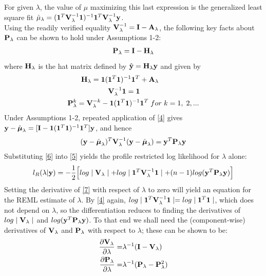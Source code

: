 \documentclass[11pt]{article}
\begin{document}
For given $\lambda$, the value of $\mu$ maximizing this last expression is the generalized least square fit $\hat{\mu}_\lambda=(\mathbf{1}^T{\bf V}_\lambda^{-1}\mathbf{1})^{-1}\mathbf{1}^T{\bf V}_\lambda^{-1}{\bf y}$.\\
Using the readily verified equality ${\bf V}_\lambda^{-1}={\bf I}-{\bf A}_\lambda$, the following key facts about ${\bf P}_\lambda$ can be shown to hold under Assumptions 1-2:
\begin{align}
{\bf P}_\lambda={\bf I}-{\bf H}_\lambda \label{13}
\end{align}
where ${\bf H}_\lambda$ is the hat matrix defined by $\hat{{\bf y}}={\bf H}_\lambda {\bf y}$ and given by
\begin{align}
{\bf H}_\lambda=\mathbf{1}(\mathbf{1}^T\mathbf{1})^{-1}\mathbf{1}^T&+{\bf A}_\lambda\\
{\bf V}_\lambda^{-1}\mathbf{1}=\mathbf{1} \label{4} \\
{\bf P}_\lambda^k={\bf V}_\lambda^{-k}-\mathbf{1}(\mathbf{1}^T\mathbf{1})^{-1}&\mathbf{1}^T\;for\;k=1,\;2,...\label{9}
\end{align}
Under Assumptions 1-2, repeated application of \eqref{4} gives ${\bf y}-\hat{\boldsymbol{\mu}}_\lambda=[{\bf I}-\mathbf{1}(\mathbf{1}^T\mathbf{1})^{-1}\mathbf{1}^T]{\bf y}$, and hence
\begin{align}
({\bf y}-\hat{\boldsymbol{\mu}}_\lambda)^T{\bf V}_\lambda^{-1}({\bf y}-\hat{\boldsymbol{\mu}}_\lambda)={\bf y}^T{\bf P}_\lambda {\bf y} \label{6}
\end{align}
Substituting \eqref{6} into \eqref{5} yields the profile restricted log likelihood for $\lambda$ alone:
\begin{align}
l_R(\lambda|{\bf y})=-\frac{1}{2}\Big[log\mid {\bf V}_\lambda \mid +log \mid \mathbf{1}^T{\bf V}_\lambda^{-1}\mathbf{1} \mid+(n-1)log({\bf y}^T{\bf P}_\lambda {\bf y})\Big] \label{7}
\end{align}
Setting the derivative of \eqref{7} with respect of $\lambda$ to zero will yield an equation for the REML estimate of $\lambda$. By \eqref{4} again, $log \mid \mathbf{1}^T{\bf V}_\lambda^{-1}\mathbf{1} \mid=log \mid \mathbf{1}^T\mathbf{1} \mid$, which does not depend on $\lambda$, so the differentiation reduces to finding the derivatives of $log\mid {\bf V}_\lambda \mid$ and $log({\bf y}^T{\bf P}_\lambda {\bf y})$. To that end we shall need the (component-wise) derivatives of ${\bf V}_\lambda$ and ${\bf P}_\lambda$ with respect to $\lambda$; these can be shown to be:
\begin{align}
\frac{\partial {\bf V}_\lambda}{\partial \lambda}=&\lambda^{-1}({\bf I}-{\bf V}_\lambda)\label{8} \\
\frac{\partial {\bf P}_\lambda}{\partial \lambda}=&\lambda^{-1}({\bf P}_\lambda-{\bf P}_\lambda^2) \label{10}
\end{align}
\end{document}
